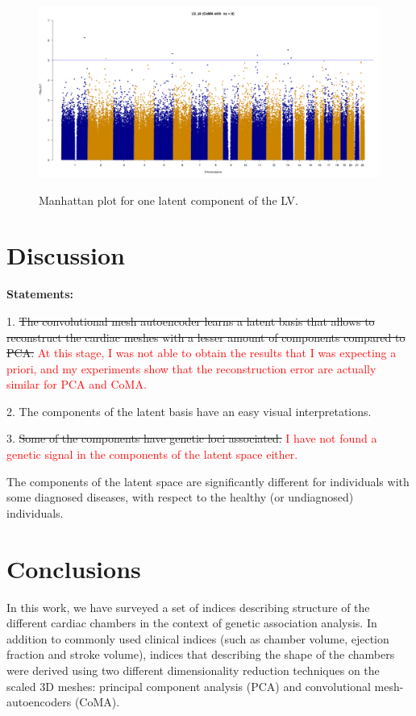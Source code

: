 \documentclass[twocolumn]{llncs}
\begin{document}
\begin{figure}[ht]
\includegraphics[width=\linewidth]{figs/gwas/2020-04-26_07_36_30_873605__LV__nz__8__gwas__manhattan__z0__inv_norm__GBR.png}
\label{fig:manhattan_LV_z1_nz_8}
\caption{Manhattan plot for one latent component of the LV.}
\end{figure}


\section{Discussion}

\textbf{Statements:}

1. \st{The convolutional mesh autoencoder learns a latent basis that allows to reconstruct the cardiac meshes with a lesser amount of components compared to PCA.} \textcolor{red}{At this stage, I was not able to obtain the results that I was expecting a priori, and my experiments show that the reconstruction error are actually similar for PCA and CoMA.}

2. The components of the latent basis have an easy visual interpretations.

3. \st{Some of the components have genetic loci associated.} \textcolor{red}{I have not found a genetic signal in the components of the latent space either.} 

The components of the latent space are significantly different for individuals with some diagnosed diseases, with respect to the healthy (or undiagnosed) individuals.

\section{Conclusions}

In this work, we have surveyed a set of indices describing structure of the different cardiac chambers in the context of genetic association analysis. In addition to commonly used clinical indices (such as chamber volume, ejection fraction and stroke volume), indices that describing the shape of the chambers were derived using two different dimensionality reduction techniques on the scaled 3D meshes: principal component analysis (PCA) and convolutional mesh-autoencoders (CoMA).
\end{document}
